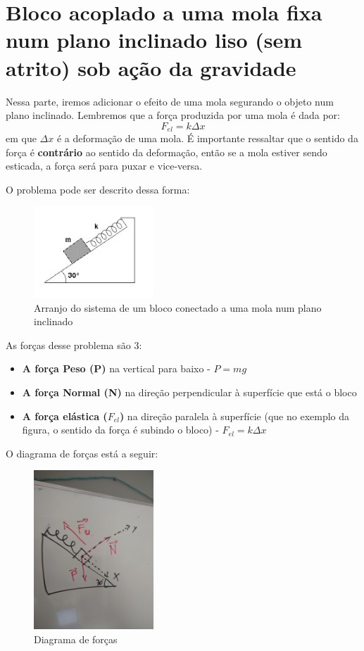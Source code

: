 \documentclass[12pt]{extarticle}
\newcommand{\<}{\langle}
\renewcommand{\>}{\rangle}
\theoremstyle{definition}
\begin{document}
\section{Bloco acoplado a uma mola fixa num plano inclinado liso (sem  atrito) sob ação da gravidade}

Nessa parte, iremos adicionar o efeito de uma mola segurando o objeto num plano inclinado. Lembremos que a força produzida por uma mola é dada por:
\begin{equation}
    F_{el} = k\Delta x
\end{equation}
em que $\Delta x$ é a deformação de uma mola. É importante ressaltar que o sentido da força é \textbf{contrário} ao sentido da deformação, então se a mola estiver sendo esticada, a força será para puxar e vice-versa.

O problema pode ser descrito dessa forma:
\begin{figure}[H]
    \centering
    \includegraphics[width=0.4\textwidth]{Pic-Hooke-04.jpg}
    \caption{Arranjo do sistema de um bloco conectado a uma mola num plano inclinado}
    \label{fig:my_label}
\end{figure}

As forças desse problema são 3:
\begin{itemize}
    \item \textbf{A força Peso (P)} na vertical para baixo - $P=mg$
    \item \textbf{A força Normal (N)} na direção perpendicular à superfície que está o bloco
    \item \textbf{A força elástica ($F_{el}$)} na direção paralela à superfície (que no exemplo da figura, o sentido da força é subindo o bloco)  - $F_{el} = k\Delta x$
\end{itemize}

O diagrama de forças está a seguir:
\begin{figure}[H]
    \centering
    \includegraphics[width=0.4\textwidth]{plano_inclinado_mola.jpg}
    \caption{Diagrama de forças}
    \label{fig:mola_sem_atrito}
\end{figure}
\end{document}
